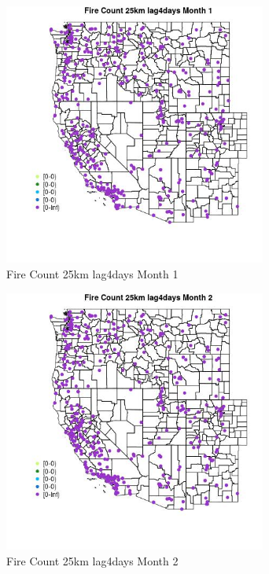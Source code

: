 \begin{figure} 
\centering  
\includegraphics[width=0.77\textwidth]{Code_Outputs/Report_ML_input_PM25_Step4_part_e_de_duplicated_aves_compiled_2019-05-18wNAs_MapObsMo1Fire_Count_25km_lag4days.jpg} 
\caption{\label{fig:Report_ML_input_PM25_Step4_part_e_de_duplicated_aves_compiled_2019-05-18wNAsMapObsMo1Fire_Count_25km_lag4days}Fire Count 25km lag4days Month 1} 
\end{figure} 
 

\begin{figure} 
\centering  
\includegraphics[width=0.77\textwidth]{Code_Outputs/Report_ML_input_PM25_Step4_part_e_de_duplicated_aves_compiled_2019-05-18wNAs_MapObsMo2Fire_Count_25km_lag4days.jpg} 
\caption{\label{fig:Report_ML_input_PM25_Step4_part_e_de_duplicated_aves_compiled_2019-05-18wNAsMapObsMo2Fire_Count_25km_lag4days}Fire Count 25km lag4days Month 2} 
\end{figure} 
 


